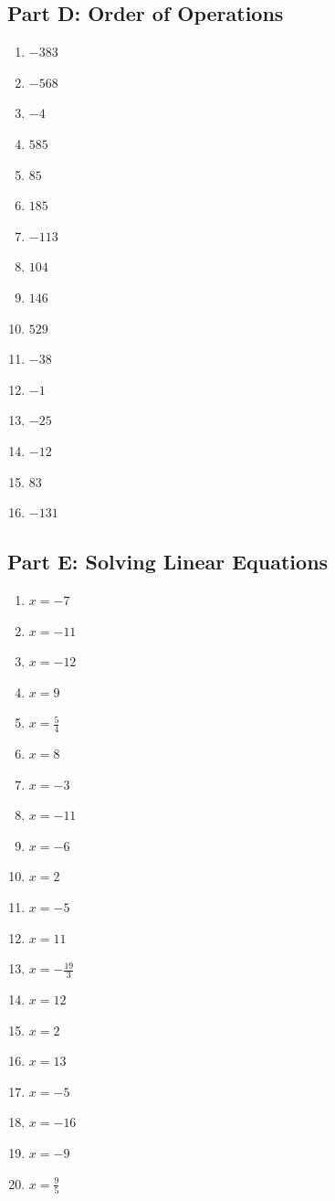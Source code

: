 \documentclass[11pt]{article}
\begin{document}
\subsection*{Part D: Order of Operations}
\begin{multicols}{3}
\begin{enumerate}
  \item $-383$
  \item $-568$
  \item $-4$
  \item $585$
  \item $85$
  \item $185$
  \item $-113$
  \item $104$
  \item $146$
  \item $529$
  \item $-38$
  \item $-1$
  \item $-25$
  \item $-12$
  \item $83$
  \item $-131$
\end{enumerate}
\end{multicols}
\subsection*{Part E: Solving Linear Equations}
\begin{multicols}{3}
\begin{enumerate}
  \item $x = -7$
  \item $x = -11$
  \item $x = -12$
  \item $x = 9$
  \item $x = \frac{5}{4}$
  \item $x = 8$
  \item $x = -3$
  \item $x = -11$
  \item $x = -6$
  \item $x = 2$
  \item $x = -5$
  \item $x = 11$
  \item $x = - \frac{19}{3}$
  \item $x = 12$
  \item $x = 2$
  \item $x = 13$
  \item $x = -5$
  \item $x = -16$
  \item $x = -9$
  \item $x = \frac{9}{5}$
\end{enumerate}
\end{multicols}
\end{document}
